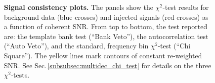 \documentclass[binding=0.6cm, LaM]{sapthesis}
\begin{document}
        \begin{figure}[!t]
          \noindent
          \label{signalconsistencyplots1}
          \centering
          \caption{\textbf{Signal consistency plots.} The panels show the $\chi^2$-test results for background data (blue crosses) and injected signals (red crosses) as a function of coherent SNR.   From top to bottom, the test reported are: the template bank test (``Bank Veto''), the autocorrelation test (``Auto Veto''), and the standard, frequency bin $\chi^2$-test (``Chi Square'').   The yellow lines mark contours of constant re-weighted SNR. See Sec.\,\ref{subsubsec:multidec_chi_test} for details on the three $\chi^2$-tests.}
          \label{fig:signalconsistencyplots1}
       	\end{figure}
\end{document}
